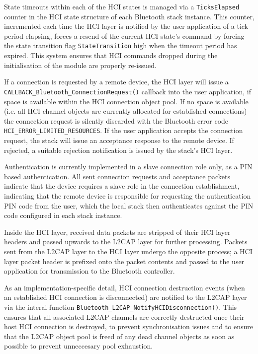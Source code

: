 State timeouts within each of the HCI states is managed via a \lstinline{TicksElapsed} counter in the HCI state structure of each Bluetooth stack instance. This counter, incremented each time the HCI layer is notified by the user application of a tick period elapsing, forces a resend of the current HCI state's command by forcing the state transition flag \lstinline{StateTransition} high when the timeout period has expired. This system ensures that HCI commands dropped during the initialisation of the module are properly re-issued.

If a connection is requested by a remote device, the HCI layer will issue a \\ \lstinline{CALLBACK_Bluetooth_ConnectionRequest()} callback into the user application, if space is available within the HCI connection object pool. If no space is available (i.e. all HCI channel objects are currently allocated for established connections) the connection request is silently discarded with the Bluetooth error code \lstinline{HCI_ERROR_LIMITED_RESOURCES}. If the user application accepts the connection request, the stack will issue an acceptance response to the remote device. If rejected, a suitable rejection notification is issued by the stack's HCI layer.

Authentication is currently implemented in a slave connection role only, as a PIN based authentication. All sent connection requests and acceptance packets indicate that the device requires a slave role in the connection establishment, indicating that the remote device is responsible for requesting the authentication PIN code from the user, which the local stack then authenticates against the PIN code configured in each stack instance.

Inside the HCI layer, received data packets are stripped of their HCI layer headers and passed upwards to the L2CAP layer for further processing. Packets sent from the L2CAP layer to the HCI layer undergo the opposite process; a HCI layer packet header is prefixed onto the packet contents and passed to the user application for transmission to the Bluetooth controller.

As an implementation-specific detail, HCI connection destruction events (when an established HCI connection is disconnected) are notified to the L2CAP layer via the interal function \lstinline{Bluetooth_L2CAP_NotifyHCIDisconnection()}. This ensures that all associated L2CAP channels are correctly destructed once their host HCI connection is destroyed, to prevent synchronisation issues and to ensure that the L2CAP object pool is freed of any dead channel objects as soon as possible to prevent unneccesary pool exhaustion.

